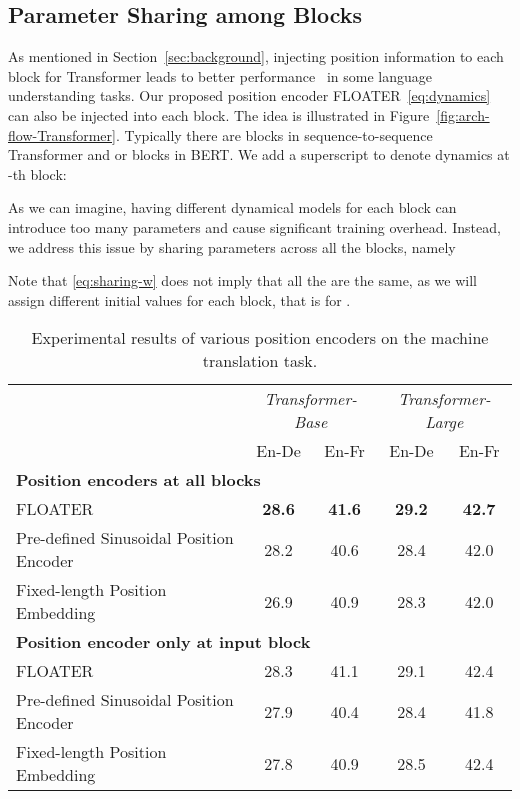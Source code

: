 \documentclass[11pt]{article}
\begin{document}
\subsection{Parameter Sharing among Blocks}
As mentioned in Section~\ref{sec:background}, injecting position information to each block for Transformer leads to better performance~\cite{dehghani2018universal,lan2019albert} in some language understanding tasks. Our proposed position encoder FLOATER~\eqref{eq:dynamics} can also be injected into each block. The idea is illustrated in Figure~\ref{fig:arch-flow-Transformer}. 
Typically there are  blocks in sequence-to-sequence Transformer and  or  blocks in BERT. We add a superscript  to denote dynamics at -th block: 

As we can imagine, having  different dynamical models  for each block can introduce too many parameters and  cause significant training overhead. Instead, we address this issue by sharing parameters across all the blocks, namely

Note that \eqref{eq:sharing-w} does not imply that all the  are the same, as we will assign different initial values for each block, that is   for .
\begin{table*}[htb]
    \centering
    \begin{tabular}{lcccc}
    \toprule
       &\multicolumn{2}{c}{\textit{Transformer-Base}} & \multicolumn{2}{c}{\textit{Transformer-Large}}  \\  
       & En-De & En-Fr & En-De & En-Fr  \\
       \midrule
        \multicolumn{5}{l}{\bf Position encoders at all blocks} \\
        FLOATER & \textbf{28.6} & \textbf{41.6} & \textbf{29.2} & \textbf{42.7}\\
        Pre-defined Sinusoidal Position Encoder & 28.2 & 40.6 & 28.4 & 42.0 \\
        Fixed-length Position Embedding & 26.9 & 40.9 & 28.3& 42.0 \\
       \midrule
        \multicolumn{5}{l}{\bf Position encoder only at input block} \\
        FLOATER & 28.3 & 41.1 & 29.1 & 42.4 \\
        Pre-defined Sinusoidal Position Encoder & 27.9 & 40.4 & 28.4 & 41.8 \\
        Fixed-length Position Embedding & 27.8 & 40.9 & 28.5 & 42.4 \\
\bottomrule
    \end{tabular}
    \caption{Experimental results of various position encoders on the machine translation task.} 
    \label{tab:exp-NMT}
\end{table*}
\end{document}

